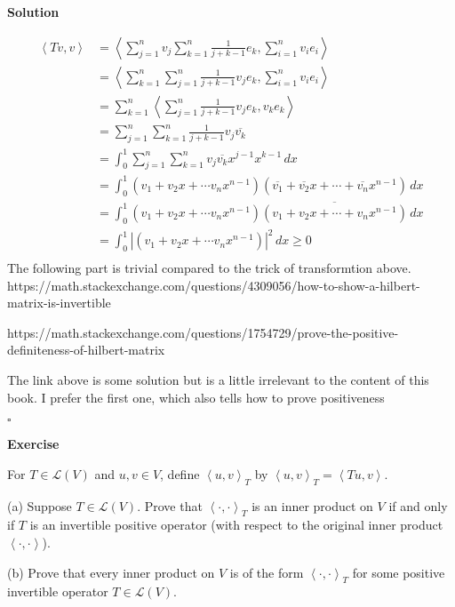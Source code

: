 \documentclass{article}
\newenvironment{exercise}{%
{\textbf{Exercise\\}
    }
}{
}
\newenvironment{solution}{%
{
    \textbf{Solution\\}
    }
}{
  \hfill $\square$ 
  \par\bigskip 
}
\begin{document}
\begin{CJK}{UTF8}{gkai}
\begin{solution}
    \[
    \begin{aligned}
        \left< Tv, v \right> &= \left< \sum_{j=1}^{n}v_j \sum_{k=1}^{n} \frac{1}{j + k - 1} e_k, \sum_{i=1}^{n} v_i e_i \right> \\
        &= \left<  \sum_{k=1}^{n}\sum_{j=1}^{n}\frac{1}{j + k - 1} v_j e_k, \sum_{i=1}^{n} v_i e_i \right> \\
        &= \sum_{k=1}^{n}\left< \sum_{j=1}^{n}\frac{1}{j + k - 1} v_j e_k, v_k e_k \right> \\
        &= \sum_{j=1}^{n} \sum_{k=1}^{n} \frac{1}{j + k - 1} v_j \overline{v_k}\\
        &= \int_{0}^{1} \sum_{j=1}^{n} \sum_{k=1}^{n}  v_j \overline{v_k} x^{j- 1} x^{k - 1} \, dx\\
        &= \int_{0}^{1} (v_1 + v_2 x + \cdots v_n x^{n - 1})(\overline{v_1} + \overline{v_2} x + \cdots + \overline{v_n}x^{n - 1})\, dx\\
        &= \int_{0}^{1} (v_1 + v_2 x + \cdots v_n x^{n - 1})\overline{(v_1 + v_2 x + \cdots + v_nx^{n - 1})}\, dx\\
        &= \int_{0}^{1} \left|(v_1 + v_2 x + \cdots v_n x^{n - 1})\right|^2\, dx \geq 0\\
    \end{aligned}    
    \]
    The following part is trivial compared to the trick of transformtion above.\\

    https://math.stackexchange.com/questions/4309056/how-to-show-a-hilbert-matrix-is-invertible

    https://math.stackexchange.com/questions/1754729/prove-the-positive-definiteness-of-hilbert-matrix

    The link above is some solution but is a little irrelevant to the content of this book. I prefer the first one, which also tells how to prove positiveness
\end{solution}

\begin{exercise}
    For $T \in\mathcal{L}(V)$ and $u,v \in V$, define $\left<u,v\right>_T$ by $\left<u,v\right>_T = \left<Tu,v\right>$.

    (a) Suppose $T \in \mathcal{L}(V)$. Prove that $\left<\cdot,\cdot\right>_T$ is an inner product on $V$ if and only if $T$ is an invertible positive operator (with respect to the original inner product $\left<\cdot,\cdot\right>$).

    (b) Prove that every inner product on $V$ is of the form $\left<\cdot,\cdot\right>_T$ for some positive
    invertible operator $T \in \mathcal{L}(V)$.
\end{exercise}


\end{CJK}
\end{document}

